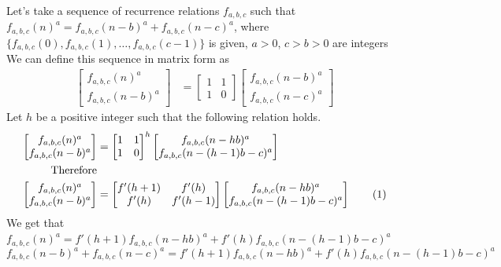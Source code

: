 \documentclass[preprint,12pt]{elsarticle}
\begin{document}
Let's take a sequence of recurrence relations $f_{a,b,c}$ such that\\ $f_{a,b,c}(n)^a = f_{a,b,c}(n - b)^a+f_{a,b,c}(n - c)^a$, where $\{f_{a,b,c}(0), f_{a,b,c}(1), \ldots, f_{a,b,c}(c - 1)\}$ is given, $a > 0$, $c > b > 0$ are integers \\
We can define this sequence in matrix form as
\begin{align*}
\begin{bmatrix}f_{a,b,c}(n)^a \\f_{a,b,c}(n - b)^a\end{bmatrix} 
&=
\begin{bmatrix}1 & 1\\1 & 0\end{bmatrix}
\begin{bmatrix}f_{a,b,c}(n - b)^a\\f_{a,b,c}(n - c)^a\end{bmatrix}
\end{align*}
Let $h$ be a positive integer such that the following relation holds.
\begin{align*}
\begin{bmatrix}f_{a,b,c}(n)^a \\f_{a,b,c}(n - b)^a\end{bmatrix}
&=
\begin{bmatrix}1 & 1\\1 & 0\end{bmatrix}^h
\begin{bmatrix}f_{a,b,c}(n - hb)^a\\f_{a,b,c}(n-(h-1)b - c)^a\end{bmatrix}\\
\text{Therefore}\\
\begin{bmatrix}f_{a,b,c}(n)^a \\f_{a,b,c}(n - b)^a\end{bmatrix}
&=
\begin{bmatrix}f'(h+1) & f'(h)\\f'(h) & f'(h-1)\end{bmatrix}
\begin{bmatrix}f_{a,b,c}(n - hb)^a\\f_{a,b,c}(n-(h-1)b - c)^a\end{bmatrix}
\stepcounter{equation}\tag{\theequation}\label{myeq1}\\
\end{align*}
We get that $f_{a,b,c}(n)^a = f'(h+1)f_{a,b,c}(n-hb)^a + f'(h)f_{a,b,c}(n-(h-1)b-c)^a$
$$f_{a,b,c}(n-b)^a+f_{a,b,c}(n-c)^a=f'(h+1)f_{a,b,c}(n-hb)^a +f'(h)f_{a,b,c}(n-(h-1)b-c)^a$$
\end{document}
